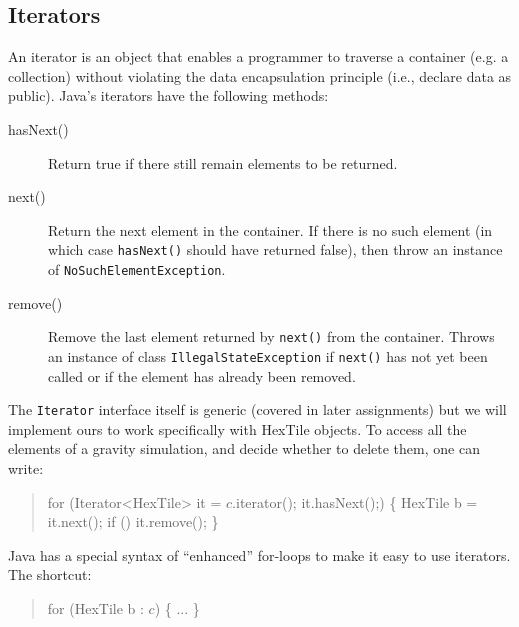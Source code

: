 \documentclass[11pt]{article}
\newcommand{\ie}{{i.e.}}
\begin{document}
\subsection{Iterators}
An iterator is an object that enables a programmer 
to traverse a container (e.g. a collection) without violating the
data encapsulation principle (\ie, declare data as public).
Java's iterators have the following methods:
\begin{description}
\item[hasNext()] Return true if there still remain elements to be returned.
\item[next()] Return the next element in the container.  If there is
  no such element (in which case \verb|hasNext()| should have returned
  false), then throw an instance of \verb|NoSuchElementException|.
\item[remove()] Remove the last element returned by \verb|next()| from
  the container.  Throws an instance of class \verb|IllegalStateException| if
  \verb|next()| has not yet been called or if the element has already
  been removed.
\end{description}
The \verb|Iterator| interface itself is generic (covered in later assignments) but we will
implement ours to work specifically with \textsf{HexTile} objects.
To access all the elements of a gravity simulation, and decide whether to
delete them, one can write:
\begin{quote}
\begin{htmlonly}
\begin{alltt}
\end{htmlonly}
%begin{latexonly}
\begin{program}
%end{latexonly}
for (Iterator<HexTile> it = $c$.iterator(); it.hasNext();) \{
   HexTile b = it.next();
   if () it.remove();
\}
%begin{latexonly}
\end{program}
%end{latexonly}
\begin{htmlonly}
\end{alltt}
\end{htmlonly}
\end{quote}
Java has a special syntax of ``enhanced'' for-loops to make it easy to use
iterators.  The shortcut:
\begin{quote}
\begin{htmlonly}
\begin{alltt}
\end{htmlonly}
%begin{latexonly}
\begin{program}
%end{latexonly}
for (HexTile b : $c$) \{
   ...
\}
%begin{latexonly}
\end{program}
%end{latexonly}
\begin{htmlonly}
\end{alltt}
\end{htmlonly}
\end{quote}
\end{document}
